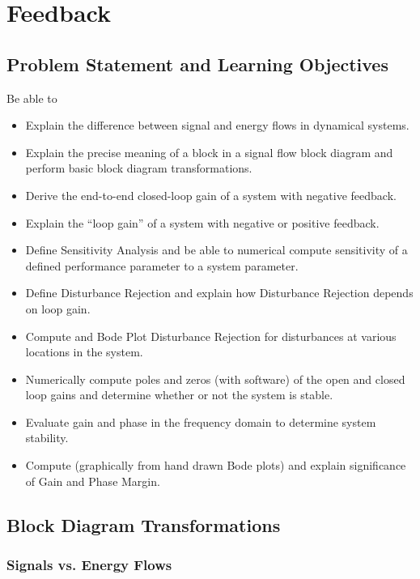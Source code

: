 %
%
%

\chapter{Feedback}\label{FeedbackChapter}

\section{Problem Statement and Learning Objectives}
Be able to

\begin{itemize}
    \item Explain the difference between signal and energy flows in dynamical systems.
    \item Explain the precise meaning of a block in a signal flow block diagram and
    perform basic block diagram transformations.
    \item  Derive the end-to-end closed-loop gain of a system with negative feedback.
    \item Explain the ``loop gain'' of a system with negative or positive feedback.
    \item Define Sensitivity Analysis and be able to numerical compute sensitivity of
    a defined performance parameter to a system parameter.
    \item Define Disturbance Rejection and explain how Disturbance Rejection depends on
    loop gain.
    \item Compute and Bode Plot  Disturbance Rejection for disturbances at various locations in the system.
    \item Numerically compute poles and zeros (with software) of the open and closed loop gains and determine whether or not the system is stable.
    \item Evaluate gain and phase in the frequency domain to determine system stability.
    \item Compute (graphically from hand drawn Bode plots) and explain significance of Gain and Phase Margin.
\end{itemize}

\section{Block Diagram Transformations}

\subsection{Signals vs. Energy Flows}

